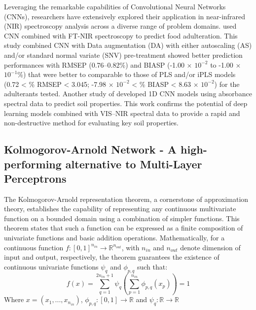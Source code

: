 \documentclass[10pt, a4paper, oneside]{article}
\begin{document}
Leveraging the remarkable capabilities of Convolutional Neural Networks (CNNs), researchers have extensively explored their application in near-infrared (NIR) spectroscopy analysis across a diverse range of problem domains. \cite{chakravartula2022use} used CNN combined with FT-NIR spectroscopy to predict food adulteration. This study combined CNN with Data augmentation (DA) with either autoscaling (AS) and/or standard normal variate (SNV) pre-treatment showed better prediction performances with RMSEP (0.76–0.82\%) and BIASP (-1.00 × $10^{-2}$  to -1.00 × $10^{-1}$\%) that were better to comparable to those of PLS and/or iPLS models (0.72 < \% RMSEP < 3.045; -7.98 × $10^{-2}$ < \% BIASP < 8.63 × $10^{-2}$) for the adulterants tested. Another study of \cite{hosseinpour2023cnn} developed 1D CNN models using absorbance spectral data to predict soil properties. This work confirms the potential of deep learning models combined with VIS–NIR spectral data to provide a rapid and non-destructive method for evaluating key soil properties.

\subsection{Kolmogorov-Arnold Network - A high-performing alternative to Multi-Layer Perceptrons}
The Kolmogorov-Arnold representation theorem, a cornerstone of approximation theory, establishes the capability of representing any continuous multivariate function on a bounded domain using a combination of simpler functions. This theorem states that such a function can be expressed as a finite composition of univariate functions and basic addition operations. Mathematically, for a continuous function $f: [0, 1]^{n_{in}} \rightarrow \mathbb{R}^{n_{out}}$, with $n_{in}$ and $n_{out}$ denote dimension of input and output, respectively, the theorem guarantees the existence of continuous univariate functions $\psi_q$ and $\phi_{p, q}$ such that:
\begin{equation}
    f(x) = \sum_{q=1}^{2n_{in} + 1} \psi_q(\sum_{p=1}^{n_{in}}\phi_{p, q}(x_p)) = 1
\end{equation}
Where $x = (x_1,...,x_{n_{in}})$, $\phi_{p, q}: [0, 1]\rightarrow \mathbb{R}$ and $\psi_q: \mathbb{R} \rightarrow \mathbb{R}$
\end{document}
